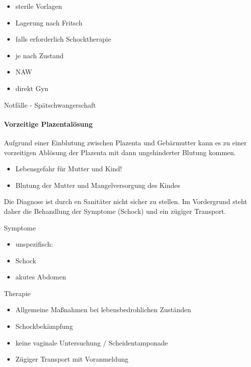 \documentclass{article}
\begin{document}
\begin{itemize}
\item sterile Vorlagen

\item Lagerung nach Fritsch

\item falls erforderlich Schocktherapie

\item je nach Zustand

\item NAW

\item direkt Gyn

\end{itemize}
Notf\"alle - Sp\"atschwangerschaft

\paragraph{Vorzeitige Plazental\"osung}
Aufgrund einer Einblutung zwischen Plazenta und Geb\"armutter kann es zu
einer vorzeitigen Abl\"osung der Plazenta mit dann ungehinderter
Blutung kommen.

\begin{itemize}
\item Lebensgefahr f\"ur Mutter und Kind! 

\end{itemize}
\begin{itemize}
\item Blutung der Mutter und Mangelversorgung des Kindes 

\end{itemize}
Die Diagnose ist durch en Sanit\"ater nicht sicher zu stellen. Im
Vordergrund steht daher die Behandlung der Symptome (Schock) und ein
z\"ugiger Transport. 

Symptome

\begin{itemize}
\item unspezifisch:

\end{itemize}
\begin{itemize}
\item Schock

\item akutes Abdomen

\end{itemize}
Therapie

\begin{itemize}
\item Allgemeine Ma{\ss}nahmen bei lebensbedrohlichen Zust\"anden

\item Schockbek\"ampfung

\item keine vaginale Untersuchung /  Scheidentamponade

\item Z\"ugiger Transport mit Voranmeldung

\end{itemize}
\end{document}
